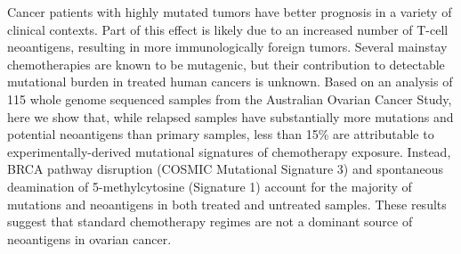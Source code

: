 Cancer patients with highly mutated tumors have better prognosis in a variety of clinical contexts. Part of this effect is likely due to an increased number of T-cell neoantigens, resulting in more immunologically foreign tumors. Several mainstay chemotherapies are known to be mutagenic, but their contribution to detectable mutational burden in treated human cancers is unknown. Based on an analysis of 115 whole genome sequenced samples from the Australian Ovarian Cancer Study, here we show that, while relapsed samples have substantially more mutations and potential neoantigens than primary samples, less than 15\% are attributable to experimentally-derived mutational signatures of chemotherapy exposure. Instead, BRCA pathway disruption (COSMIC Mutational Signature 3) and spontaneous deamination of 5-methylcytosine (Signature 1) account for the majority of mutations and neoantigens in both treated and untreated samples. These results suggest that standard chemotherapy regimes are not a dominant source of neoantigens in ovarian cancer.

